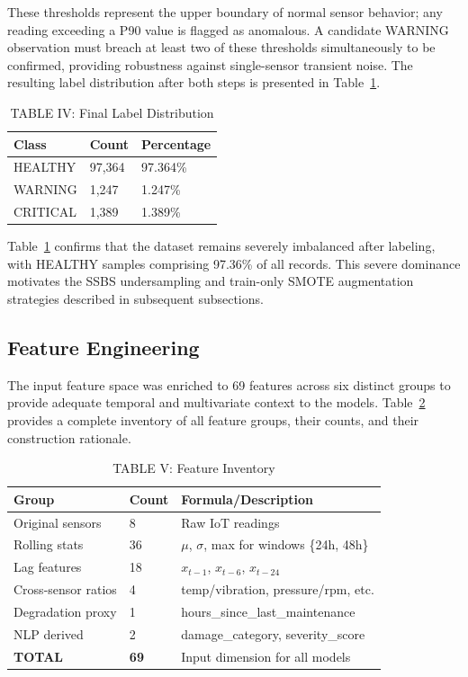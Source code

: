 \documentclass[conference]{IEEEtran}
\begin{document}
These thresholds represent the upper boundary of normal sensor behavior; any reading exceeding a P90 value is flagged as anomalous. A candidate WARNING observation must breach at least two of these thresholds simultaneously to be confirmed, providing robustness against single-sensor transient noise. The resulting label distribution after both steps is presented in Table~\ref{tab:final_label_dist}.

\begin{table}[htbp]
\caption{TABLE IV: Final Label Distribution}
\centering
\begin{tabular}{lll}
\hline
\textbf{Class} & \textbf{Count} & \textbf{Percentage} \\
\hline
HEALTHY & 97,364 & 97.364\% \\
WARNING & 1,247 & 1.247\% \\
CRITICAL & 1,389 & 1.389\% \\
\hline
\end{tabular}
\label{tab:final_label_dist}
\end{table}

Table~\ref{tab:final_label_dist} confirms that the dataset remains severely imbalanced after labeling, with HEALTHY samples comprising 97.36\% of all records. This severe dominance motivates the SSBS undersampling and train-only SMOTE augmentation strategies described in subsequent subsections.

\subsection{Feature Engineering}
The input feature space was enriched to 69 features across six distinct groups to provide adequate temporal and multivariate context to the models. Table~\ref{tab:feature_inventory} provides a complete inventory of all feature groups, their counts, and their construction rationale.

\begin{table}[htbp]
\caption{TABLE V: Feature Inventory}
\centering
\begin{tabular}{lll}
\hline
\textbf{Group} & \textbf{Count} & \textbf{Formula/Description} \\
\hline
Original sensors & 8 & Raw IoT readings \\
Rolling stats & 36 & $\mu$, $\sigma$, max for windows \{24h, 48h\} \\
Lag features & 18 & $x_{t-1}$, $x_{t-6}$, $x_{t-24}$ \\
Cross-sensor ratios & 4 & temp/vibration, pressure/rpm, etc. \\
Degradation proxy & 1 & hours\_since\_last\_maintenance \\
NLP derived & 2 & damage\_category, severity\_score \\
\hline
\textbf{TOTAL} & \textbf{69} & Input dimension for all models \\
\hline
\end{tabular}
\label{tab:feature_inventory}
\end{table}
\end{document}
